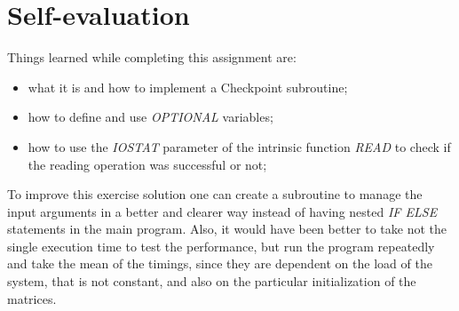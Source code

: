 \documentclass[11pt,a4paper]{article}
\begin{document}
\section{Self-evaluation} %

Things learned while completing this assignment are:
\begin{itemize}
	\item what it is and how to implement a Checkpoint subroutine;
	\item how to define and use \textit{OPTIONAL} variables;
	\item how to use the \textit{IOSTAT} parameter of the intrinsic function \textit{READ} to check if the reading operation was successful or not; 
\end{itemize}

To improve this exercise solution one can create a subroutine to manage the input arguments in a better and clearer way instead of having nested \textit{IF ELSE} statements in the main program.
Also, it would have been better to take not the single execution time to test the performance, but run the program repeatedly and take the mean of the timings, since they are dependent on the load of the system, that is not constant, and also on the particular initialization of the matrices. 
	
\end{document}
